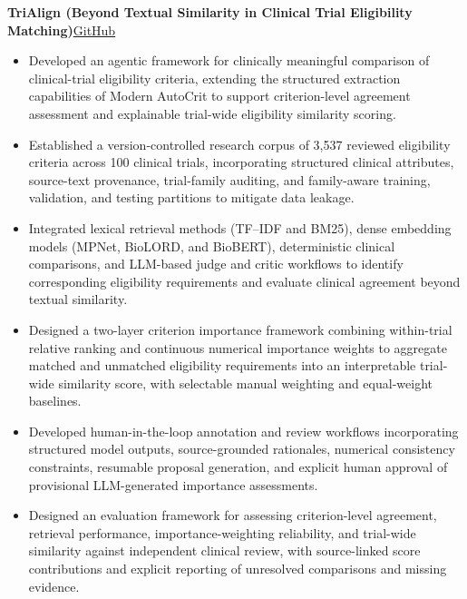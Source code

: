 \documentclass[11pt]{article}
\newcommand{\projectentry}[2]{%
  \Needspace{8\baselineskip}%
  \textbf{#1}\hfill #2\\[-8pt]%
}
\newenvironment{tightitemize}{%
  \vspace{-2pt}%
  \begin{itemize}[leftmargin=*,topsep=0pt,itemsep=1pt,parsep=0pt,partopsep=0pt]
}{%
  \end{itemize}\vspace{4pt}
}
\begin{document}
\projectentry
{TriAlign (Beyond Textual Similarity in Clinical Trial Eligibility Matching)}
{\href{https://github.com/JonathanMa03/trialign}{GitHub}}
\begin{tightitemize}
\item Developed an agentic framework for clinically meaningful comparison of clinical-trial eligibility criteria, extending the structured extraction capabilities of Modern AutoCrit to support criterion-level agreement assessment and explainable trial-wide eligibility similarity scoring.
\item Established a version-controlled research corpus of 3,537 reviewed eligibility criteria across 100 clinical trials, incorporating structured clinical attributes, source-text provenance, trial-family auditing, and family-aware training, validation, and testing partitions to mitigate data leakage.
\item Integrated lexical retrieval methods (TF--IDF and BM25), dense embedding models (MPNet, BioLORD, and BioBERT), deterministic clinical comparisons, and LLM-based judge and critic workflows to identify corresponding eligibility requirements and evaluate clinical agreement beyond textual similarity.
\item Designed a two-layer criterion importance framework combining within-trial relative ranking and continuous numerical importance weights to aggregate matched and unmatched eligibility requirements into an interpretable trial-wide similarity score, with selectable manual weighting and equal-weight baselines.
\item Developed human-in-the-loop annotation and review workflows incorporating structured model outputs, source-grounded rationales, numerical consistency constraints, resumable proposal generation, and explicit human approval of provisional LLM-generated importance assessments.
\item Designed an evaluation framework for assessing criterion-level agreement, retrieval performance, importance-weighting reliability, and trial-wide similarity against independent clinical review, with source-linked score contributions and explicit reporting of unresolved comparisons and missing evidence.
\end{tightitemize}
\end{document}
